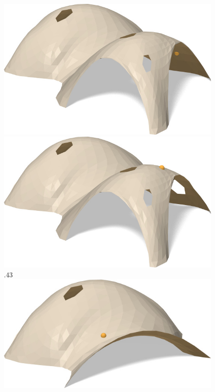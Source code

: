 \documentclass[review]{acmsiggraph}
\begin{document}
  \begin{figure}[t]
  \newdimen\tmplen{}\textwidth
  \centerline{\includegraphics[width=2.57\tmplen]{fig/remove-1n.jpg}\hfill
	  \includegraphics[width=2.57\tmplen]{fig/remove-2n.jpg}\hfill
	  \raise.43\tmplen
	\hbox{\includegraphics[width=2.23\tmplen]{fig/remove-3n.jpg}}\hfill
}
\end{figure}
\end{document}
